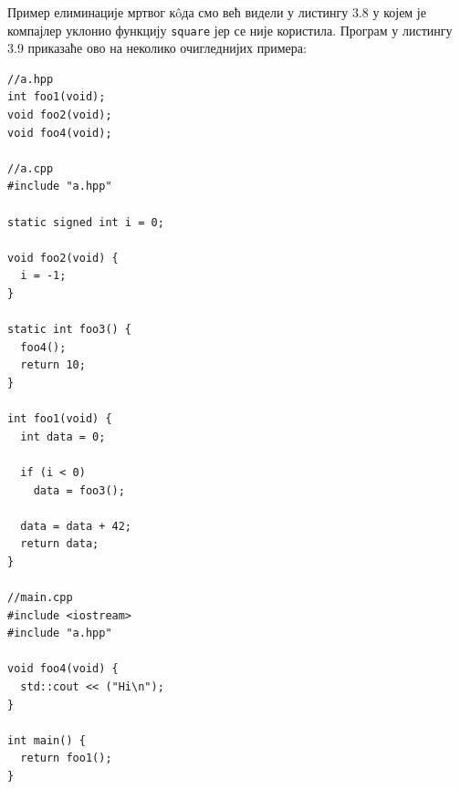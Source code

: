\documentclass[12pt,oneside]{memoir}
\begin{document}
Пример елиминације мртвог к\^{o}да смо већ видели у листингу 3.8
у којем је компајлер уклонио функцију \texttt{square} јер се није користила. Програм
у листингу 3.9 приказаће ово на неколико очигледнијих примера:

\begin{lstlisting}[frame=single,caption={Пример елиминације мртвог к\^{o}да}, captionpos=b]
//a.hpp
int foo1(void);
void foo2(void);
void foo4(void);

//a.cpp
#include "a.hpp"

static signed int i = 0;

void foo2(void) {
  i = -1;
}

static int foo3() {
  foo4();
  return 10;
}

int foo1(void) {
  int data = 0;

  if (i < 0)
    data = foo3();

  data = data + 42;
  return data;
}

//main.cpp
#include <iostream>
#include "a.hpp"

void foo4(void) {
  std::cout << ("Hi\n");
}

int main() {
  return foo1();
}

\end{lstlisting}
\end{document}
